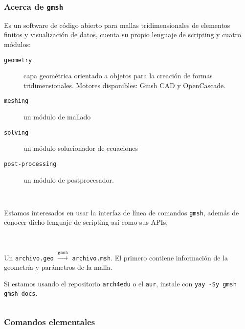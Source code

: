 




\begin{frame}[fragile]
	\frametitle{Acerca de \texttt{gmsh}}

	Es un software de código abierto para mallas tridimensionales de
	elementos finitos y visualización de datos, cuenta su propio
	lenguaje de scripting y cuatro módulos:

	\begin{description}
		\item[\texttt{geometry}]

			capa geométrica orientado a objetos para la creación de
			formas tridimensionales.
			Motores disponibles: Gmsh CAD y OpenCascade.

		\item[\texttt{meshing}]

			un módulo de mallado

		\item[\texttt{solving}]

			un módulo solucionador de ecuaciones

		\item[\texttt{post-processing}]

			un módulo de postprocesador.
	\end{description}

	\

	Estamos interesados en usar la interfaz de línea de comandos
	\verb|gmsh|, además de conocer dicho lenguaje de scripting así
	como sus APIs.

	\

	Un \verb|archivo.geo| $\stackrel{\texttt{gmsh}}{\longrightarrow}$ \verb|archivo.msh|.
	El primero contiene información de la geometría y parámetros de la malla.
\end{frame}

\begin{frame}[fragile]
	Si estamos usando el repositorio \verb|arch4edu| o el \verb|aur|,
	instale con \verb|yay -Sy gmsh gmsh-docs|.\scriptsize

	\inputminted{bash}{arch4edu.sample}
\end{frame}

\begin{frame}[fragile]
	\frametitle{Comandos elementales}

\end{frame}

